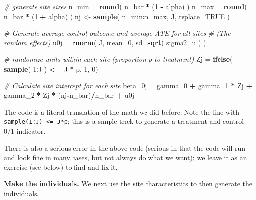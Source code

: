 \documentclass[
]{book}
\newenvironment{Shaded}{\begin{snugshade}}{\end{snugshade}}
\newcommand{\AttributeTok}[1]{\textcolor[rgb]{0.13,0.29,0.53}{#1}}
\newcommand{\CommentTok}[1]{\textcolor[rgb]{0.56,0.35,0.01}{\textit{#1}}}
\newcommand{\ConstantTok}[1]{\textcolor[rgb]{0.56,0.35,0.01}{#1}}
\newcommand{\DecValTok}[1]{\textcolor[rgb]{0.00,0.00,0.81}{#1}}
\newcommand{\FunctionTok}[1]{\textcolor[rgb]{0.13,0.29,0.53}{\textbf{#1}}}
\newcommand{\NormalTok}[1]{#1}
\newcommand{\OtherTok}[1]{\textcolor[rgb]{0.56,0.35,0.01}{#1}}
\newcommand{\SpecialCharTok}[1]{\textcolor[rgb]{0.81,0.36,0.00}{\textbf{#1}}}
\begin{document}
\begin{Shaded}
\begin{Highlighting}[]
\CommentTok{\# generate site sizes }
\NormalTok{n\_min }\OtherTok{=} \FunctionTok{round}\NormalTok{( n\_bar }\SpecialCharTok{*}\NormalTok{ (}\DecValTok{1} \SpecialCharTok{{-}}\NormalTok{ alpha) )}
\NormalTok{n\_max }\OtherTok{=} \FunctionTok{round}\NormalTok{( n\_bar }\SpecialCharTok{*}\NormalTok{ (}\DecValTok{1} \SpecialCharTok{+}\NormalTok{ alpha) )}
\NormalTok{nj }\OtherTok{\textless{}{-}} \FunctionTok{sample}\NormalTok{( n\_min}\SpecialCharTok{:}\NormalTok{n\_max, J, }\AttributeTok{replace=}\ConstantTok{TRUE}\NormalTok{ )}

\CommentTok{\# Generate average control outcome and average ATE for all sites}
\CommentTok{\# (The random effects)}
\NormalTok{u0j }\OtherTok{=} \FunctionTok{rnorm}\NormalTok{( J, }\AttributeTok{mean=}\DecValTok{0}\NormalTok{, }\AttributeTok{sd=}\FunctionTok{sqrt}\NormalTok{( sigma2\_u ) )}

\CommentTok{\# randomize units within each site (proportion p to treatment)}
\NormalTok{Zj }\OtherTok{=} \FunctionTok{ifelse}\NormalTok{( }\FunctionTok{sample}\NormalTok{( }\DecValTok{1}\SpecialCharTok{:}\NormalTok{J ) }\SpecialCharTok{\textless{}=}\NormalTok{ J }\SpecialCharTok{*}\NormalTok{ p, }\DecValTok{1}\NormalTok{, }\DecValTok{0}\NormalTok{)}

\CommentTok{\# Calculate site intercept for each site}
\NormalTok{beta\_0j }\OtherTok{=}\NormalTok{ gamma\_0 }\SpecialCharTok{+}\NormalTok{ gamma\_1 }\SpecialCharTok{*}\NormalTok{ Zj }\SpecialCharTok{+}\NormalTok{ gamma\_2 }\SpecialCharTok{*}\NormalTok{ Zj }\SpecialCharTok{*}\NormalTok{ (nj}\SpecialCharTok{{-}}\NormalTok{n\_bar)}\SpecialCharTok{/}\NormalTok{n\_bar }\SpecialCharTok{+}\NormalTok{ u0j}
\end{Highlighting}
\end{Shaded}

The code is a literal translation of the math we did before.
Note the line with \texttt{sample(1:J)\ \textless{}=\ J*p}; this is a simple trick to generate a treatment and control 0/1 indicator.

There is also a serious error in the above code (serious in that the code will run and look fine in many cases, but not always do what we want); we leave it as an exercise (see below) to find and fix it.

\textbf{Make the individuals.}
We next use the site characteristics to then generate the individuals.
\end{document}
